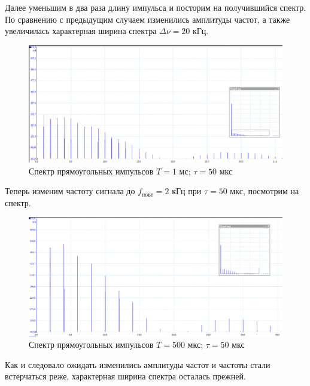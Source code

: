 \documentclass[a4paper,12pt]{article}
\begin{document}
Далее уменьшим в два раза длину импульса и посторим на получившийся спектр. По сравнению с предыдущим случаем изменились амплитуды частот, а также увеличилась характерная ширина спектра $\Delta \nu = 20$ кГц.
\begin{figure}[H]\label{fig: 1kHz50mks}
    \centering
    \includegraphics[width =\textwidth]{1kHz50mks.png}
    \caption{Спектр прямоугольных импульсов $T = 1$ мс; $\tau = 50$ мкс}
\end{figure}
Теперь изменим частоту сигнала до $f_{повт} = 2$ кГц при $\tau = 50$ мкс, посмотрим на спектр.
\begin{figure}[H]\label{fig: 2kHz50mks}
    \centering
    \includegraphics[width =\textwidth]{2kHz50mks.png}
    \caption{Спектр прямоугольных импульсов $T = 500$ мкс; $\tau = 50$ мкс}
\end{figure}
Как и следовало ожидать изменились амплитуды частот и частоты стали встерчаться реже, характерная ширина спектра осталась прежней.
\end{document}
